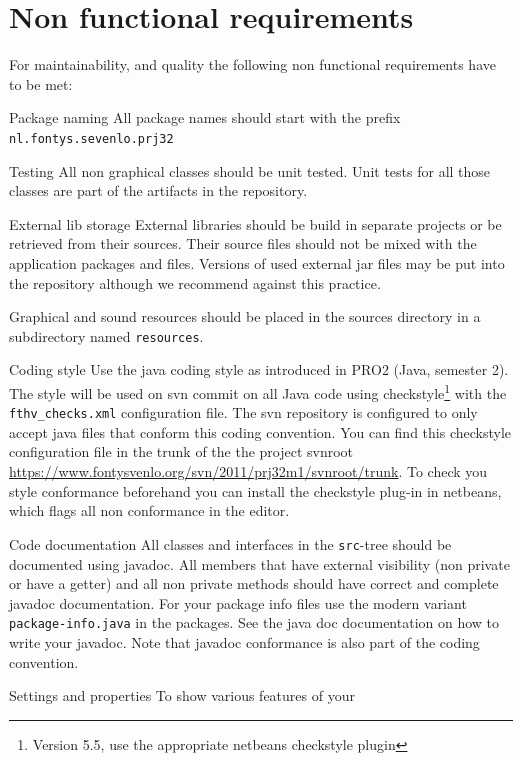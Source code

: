 \section{Non functional requirements}
For maintainability, and quality the following non functional
requirements have to be met:
\begin{Description}
  
\item[Package naming] All package names should start with the prefix
  \texttt{nl.fontys.sevenlo.prj32}
\item[Testing] All non graphical classes should be unit tested. Unit tests for
  all those classes are part of the artifacts in the repository.
\item[External lib storage] External libraries should be build in
  separate projects or be retrieved from their sources. Their source
  files should not be mixed with the application packages and
  files. Versions of used external jar files may be put into the
  repository although we recommend against this practice. 
\item[Graphical and sound resources] should be placed in the sources directory
  in a subdirectory named \texttt{resources}.
\item[Coding style] Use the java coding style as introduced in
  PRO2 (Java, semester 2). The style will be used on svn commit on all
  Java code using checkstyle\footnote{Version 5.5, use the appropriate
    netbeans checkstyle plugin} with the \texttt{fthv\_checks.xml}
  configuration file. The svn repository is configured to only accept
  java files that conform this coding convention.
  You can find this checkstyle configuration file in the trunk  of the
  the project svnroot \url{https://www.fontysvenlo.org/svn/2011/prj32m1/svnroot/trunk}. To check you style conformance beforehand you
  can install the checkstyle plug-in in netbeans, which flags all non
  conformance in the editor. 
\item[Code documentation] All classes and interfaces in the
  \texttt{src}-tree should be documented using javadoc. All members
  that have external visibility  (non private or have a getter) and
  all non private methods should have correct and complete javadoc
  documentation. For your package info files use the modern variant
  \texttt{package-info.java} in the packages. See the java doc
  documentation on how to write your javadoc. Note that javadoc
  conformance is also part of the coding convention.
\item[Settings and properties] To show various features of your

\end{Description}
